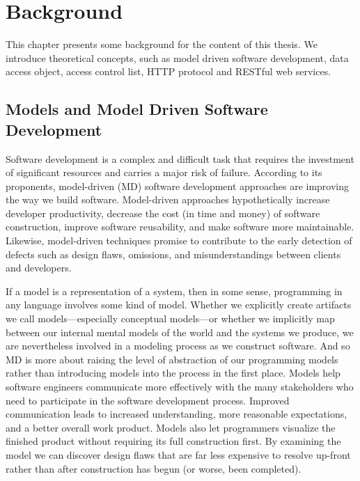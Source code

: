 
\chapter{Background} %

\label{chapter2_bg}
This chapter presents some background for the content of this thesis. We introduce theoretical concepts, such as model driven software development, data access object, access control list, HTTP protocol and RESTful web services.

\section{Models and Model Driven Software Development}
\label{mdsd}
Software development is a complex and difficult task that requires the investment of significant resources and carries a major risk of failure. According to its proponents, model-driven (MD) software development approaches are improving the way we build software. Model-driven approaches hypothetically increase developer productivity, decrease the cost (in time and money) of software construction, improve software reusability, and make software more maintainable. Likewise, model-driven techniques promise to contribute to the early detection of defects such as design flaws, omissions, and misunderstandings between clients and developers. \par
	If a model is a representation of a system, then in some sense, programming in any language involves some kind of model. Whether we explicitly create artifacts we call models—especially conceptual models—or whether we implicitly map between our internal mental models of the world and the systems we produce, we are nevertheless involved in a modeling process as we construct software. And so MD is more about raising the level of abstraction of our programming models rather than introducing models into the process in the first place. Models  help software engineers communicate more effectively with the many stakeholders who need to participate in the software development process. Improved communication leads to increased understanding, more reasonable expectations, and a better overall work product. Models also let programmers visualize the finished product without requiring its full construction first. By examining the model we can discover design flaws that are far less expensive to resolve up-front rather than after construction has begun (or worse, been completed).\par
